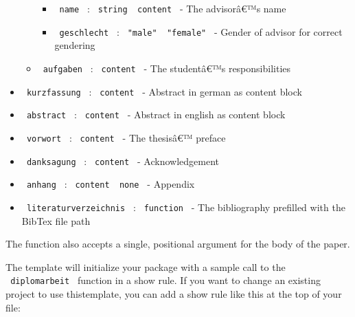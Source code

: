 \begin{itemize}
\begin{itemize}
    \begin{itemize}
    \tightlist
    \item
      \texttt{\ name\ } : \texttt{\ string\ \textbar{}\ content\ } - The
      advisorâ€™s name
    \item
      \texttt{\ geschlecht\ } :
      \texttt{\ "male"\ \textbar{}\ "female"\ } - Gender of advisor for
      correct gendering
    \end{itemize}
  \item
    \texttt{\ aufgaben\ } : \texttt{\ content\ } - The studentâ€™s
    responsibilities
  \end{itemize}
\item
  \texttt{\ kurzfassung\ } : \texttt{\ content\ } - Abstract in german
  as content block
\item
  \texttt{\ abstract\ } : \texttt{\ content\ } - Abstract in english as
  content block
\item
  \texttt{\ vorwort\ } : \texttt{\ content\ } - The thesisâ€™ preface
\item
  \texttt{\ danksagung\ } : \texttt{\ content\ } - Acknowledgement
\item
  \texttt{\ anhang\ } : \texttt{\ content\ \textbar{}\ none\ } -
  Appendix
\item
  \texttt{\ literaturverzeichnis\ } : \texttt{\ function\ } - The
  bibliography prefilled with the BibTex file path
\end{itemize}

The function also accepts a single, positional argument for the body of
the paper.

The template will initialize your package with a sample call to the
\texttt{\ diplomarbeit\ } function in a show rule. If you want to change
an existing project to use thistemplate, you can add a show rule like
this at the top of your file:

